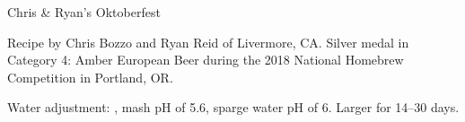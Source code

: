 \begin{recipe}{Chris \& Ryan's Oktoberfest}

\begin{aboutblock}
Recipe by Chris Bozzo and Ryan Reid of Livermore, CA. Silver medal in Category 4:
Amber European Beer during the 2018 National Homebrew Competition in Portland, OR.
\sourceaha
\end{aboutblock}


\begin{methodandtiming}

\begin{mashsteps}
\end{mashsteps}

\begin{fermentationsteps}
\end{fermentationsteps}

\begin{directions}
Water adjustment: , mash pH of 5.6, sparge
water pH of 6. Larger for 14--30 days.
\end{directions}

\end{methodandtiming}

\recipebreak

\begin{ingredientsblock}

\begin{malts}
\end{malts}

\begin{hops}
\end{hops}


\end{ingredientsblock}

\end{recipe}

